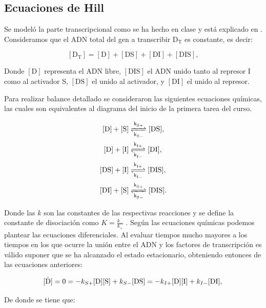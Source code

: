 \documentclass[12pt]{article}
\begin{document}
\subsection{Ecuaciones de Hill}

Se model\'o la parte transcripcional como se ha hecho en clase y est\'a explicado en \cite{alon06}. Consideramos que el ADN total del gen a transcribir $\text{D}_{\text{T}}$ es constante, es decir:

\begin{equation} \label{eq:D_T}
[\text{D}_{\text{T}}]=[\text{D}]+[\text{DS}]+[\text{DI}]+[\text{DIS}],
\end{equation}

Donde $[\text{D}]$ representa el ADN libre, $[\text{DIS}]$ el ADN unido tanto al represor I como al activador S, $[\text{DS}]$ el unido al activador, y $[\text{DI}]$ el unido al represor.

Para realizar balance detallado se consideraron las siguientes ecuaciones qu\'imicas, las cuales son equivalentes al diagrama del inicio  de la primera tarea del curso.

\begin{align}
\ce{[D] + [S]} &\ce{<=>[\ce{k_{S+}}][\ce{k_{S-}}] [DS]}, \label{eq:rchem1}\\ 
\ce{[D] + [I]} &\ce{<=>[\ce{k_{I+}}][\ce{k_{I-}}] [DI]}, \label{eq:rchem2}\\
\ce{[DS] + [I]} &\ce{ <=>[\ce{k_{I+}}][\ce{k_{I-}}] [DIS]}, \label{eq:rchem3}\\ 
\ce{[DI] + [S]} &\ce{<=>[\ce{k_{S+}}][\ce{k_{S-}}] [DIS]}. \label{eq:rchem4}
\end{align}

Donde las $k$ son las constantes de las respectivas reacciones y se define la constante de disociaci\'on como $K = \frac{k_-}{k_+}$ \cite{alon06}. Seg\'un las ecuaciones qu\'imicas podemos plantear las ecuaciones diferenciales. Al evaluar tiempos mucho mayores a los tiempos en los que ocurre la uni\'on entre el ADN y los factores de transcripci\'on es v\'alido suponer que se ha alcanzado el estado estacionario, obteniendo entonces de las ecuaciones anteriores:

\begin{equation}
\label{eq:Dss}
\dot{[\text{D}]}=0=-k_{S+}[\text{D}][\text{S}]+k_{S-}[\text{DS}]=-k_{I+}[\text{D}][\text{I}]+k_{I-}[\text{DI}],\\
\end{equation}

De donde se tiene que:
\end{document}
